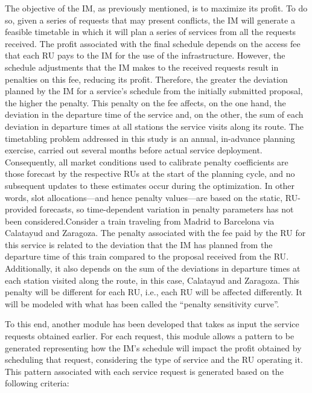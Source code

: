 \documentclass[Afour,sagev,times]{sagej}
\begin{document}
The objective of the \gls{IM}, as previously mentioned, is to maximize its profit. To do so, given a series of requests that may present conflicts, the \gls{IM} will generate a feasible timetable in which it will plan a series of services from all the requests received. The profit associated with the final schedule depends on the access fee that each \gls{RU} pays to the \gls{IM} for the use of the infrastructure. However, the schedule adjustments that the \gls{IM} makes to the received requests result in penalties on this fee, reducing its profit. Therefore, the greater the deviation planned by the \gls{IM} for a service's schedule from the initially submitted proposal, the higher the penalty. This penalty on the fee affects, on the one hand, the deviation in the departure time of the service and, on the other, the sum of each deviation in departure times at all stations the service visits along its route. The timetabling problem addressed in this study is an annual, in-advance planning exercise, carried out several months before actual service deployment. Consequently, all market conditions used to calibrate penalty coefficients are those forecast by the respective \glspl{RU} at the start of the planning cycle, and no subsequent updates to these estimates occur during the optimization. In other words, slot allocations—and hence penalty values—are based on the static, \gls{RU}-provided forecasts, so time-dependent variation in penalty parameters has not been considered.Consider a train traveling from Madrid to Barcelona via Calatayud and Zaragoza. The penalty associated with the fee paid by the \gls{RU} for this service is related to the deviation that the \gls{IM} has planned from the departure time of this train compared to the proposal received from the \gls{RU}. Additionally, it also depends on the sum of the deviations in departure times at each station visited along the route, in this case, Calatayud and Zaragoza. This penalty will be different for each RU, i.e., each \gls{RU} will be affected differently. It will be modeled with what has been called the ``penalty sensitivity curve''.

To this end, another module has been developed that takes as input the service requests obtained earlier. For each request, this module allows a pattern to be generated representing how the IM's schedule will impact the profit obtained by scheduling that request, considering the type of service and the \gls{RU} operating it. This pattern associated with each service request is generated based on the following criteria:
\end{document}
